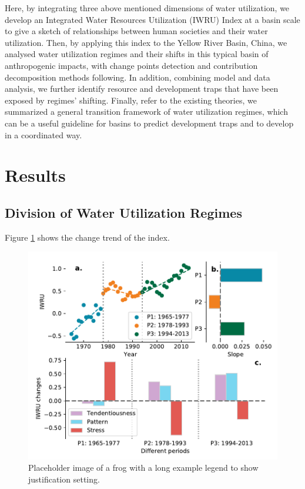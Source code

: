 \documentclass[9pt, twocolumn, twoside, lineno]{pnas-new}
\begin{document}
Here, by integrating three above mentioned dimensions of water utilization, 
we develop an Integrated Water Resources Utilization (IWRU) Index at a basin scale
to give a sketch of relationships between human societies and their water utilization.
Then, by applying this index to the Yellow River Basin, China,
we analysed water utilization regimes and their shifts in this typical basin of anthropogenic impacts, 
with change points detection and contribution decomposition methods following.
In addition, combining model and data analysis, 
we further identify resource and development traps that have been exposed by regimes' shifting.
Finally, refer to the existing theories, we summarized a general transition framework of water utilization regimes, 
which can be a useful guideline for basins to predict development traps and to develop in a coordinated way.


\section*{Results}
\subsection*{Division of Water Utilization Regimes}
Figure \ref{fig:wcci} shows the change trend of the index.

\begin{figure}%
	\centering
	\includegraphics[width=\linewidth]{../../figures/main_text/index}
	\caption{Placeholder image of a frog with a long example legend to show justification setting.}
	\label{fig:wcci}
\end{figure}
\end{document}
